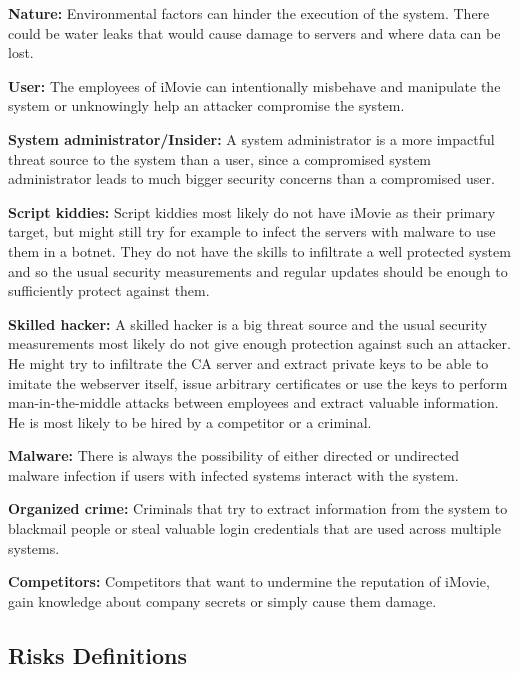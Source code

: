 \documentclass[english]{article}
\begin{document}
\begin{description}
\item{\textbf{Nature:}} Environmental factors can hinder the execution of the system. There could be water leaks that would cause damage to servers and where data can be lost.
\item{\textbf{User:}} The employees of iMovie can intentionally misbehave and manipulate the system or unknowingly help an attacker compromise the system.
\item{\textbf{System administrator/Insider:}} A system administrator is a more impactful threat source to the system than a user, since a compromised system administrator leads to much bigger security concerns than a compromised user.
\item{\textbf{Script kiddies:}} Script kiddies most likely do not have iMovie as their primary target, but might still try for example to infect the servers with malware to use them in a botnet. They do not have the skills to infiltrate a well protected system and so the usual security measurements and regular updates should be enough to sufficiently protect against them.
\item{\textbf{Skilled hacker:}} A skilled hacker is a big threat source and the usual security measurements most likely do not give enough protection against such an attacker. He might try to infiltrate the CA server and extract private keys to be able to imitate the webserver itself, issue arbitrary certificates or use the keys to perform man-in-the-middle attacks between employees and extract valuable information. He is most likely to be hired by a competitor or a criminal.
\item{\textbf{Malware:}} There is always the possibility of either directed or undirected malware infection if users with infected systems interact with the system.
\item{\textbf{Organized crime:}} Criminals that try to extract information from the system to blackmail people or steal valuable login credentials that are used across multiple systems.
\item{\textbf{Competitors:}} Competitors that want to undermine the reputation of iMovie, gain knowledge about company secrets or simply cause them damage.
\end{description}

\subsection{Risks Definitions}
\end{document}
